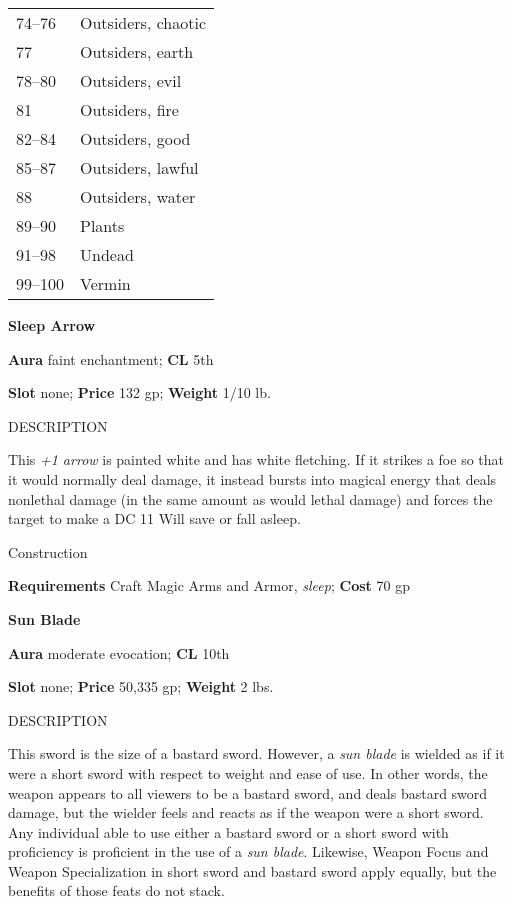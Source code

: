 \begin{tabular}{ll}
74--76        & Outsiders, chaotic                  \\
77           & Outsiders, earth                    \\
78--80        & Outsiders, evil                     \\
81           & Outsiders, fire                     \\
82--84        & Outsiders, good                     \\
85--87        & Outsiders, lawful                   \\
88           & Outsiders, water                    \\
89--90        & Plants                              \\
91--98        & Undead                              \\
99--100       & Vermin                             
\end{tabular}

\textbf{Sleep Arrow}
				
\textbf{Aura} faint enchantment;\textbf{ CL }5th
				
\textbf{Slot} none; \textbf{Price} 132 gp; \textbf{Weight} 1/10 lb.
				
DESCRIPTION
				
This \textit{+1 arrow} is painted white and has white fletching. If it strikes a foe so that it would normally deal damage, it instead bursts into magical energy that deals nonlethal damage (in the same amount as would lethal damage) and forces the target to make a DC 11 Will save or fall asleep. 
				
Construction
				
\textbf{Requirements} Craft Magic Arms and Armor, \textit{sleep}; \textbf{Cost }70 gp
				
\textbf{Sun Blade}
				
\textbf{Aura} moderate evocation;\textbf{ CL }10th
				
\textbf{Slot} none; \textbf{Price} 50,335 gp; \textbf{Weight} 2 lbs.
				
DESCRIPTION
				
This sword is the size of a bastard sword. However, a \textit{sun blade} is wielded as if it were a short sword with respect to weight and ease of use. In other words, the weapon appears to all viewers to be a bastard sword, and deals bastard sword damage, but the wielder feels and reacts as if the weapon were a short sword. Any individual able to use either a bastard sword or a short sword with proficiency is proficient in the use of a \textit{sun blade}. Likewise, Weapon Focus and Weapon Specialization in short sword and bastard sword apply equally, but the benefits of those feats do not stack.
				
